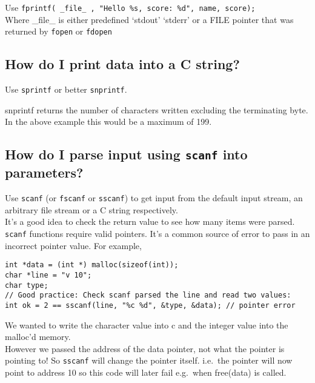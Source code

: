Use
\texttt{fprintf(\ \_file\_\ ,\ "Hello\ \%s,\ score:\ \%d",\ name,\ score);}\\Where
\_file\_ is either predefined `stdout' `stderr' or a FILE pointer that
was returned by \texttt{fopen} or \texttt{fdopen}

\subsection{How do I print data into a C
string?}\label{how-do-i-print-data-into-a-c-string}

Use \texttt{sprintf} or better \texttt{snprintf}.

\begin{Shaded}
\end{Shaded}

snprintf returns the number of characters written excluding the
terminating byte. In the above example this would be a maximum of 199.

\subsection{\texorpdfstring{How do I parse input using \texttt{scanf}
into
parameters?}{How do I parse input using scanf into parameters?}}\label{how-do-i-parse-input-using-scanf-into-parameters}

Use \texttt{scanf} (or \texttt{fscanf} or \texttt{sscanf}) to get input
from the default input stream, an arbitrary file stream or a C string
respectively.\\It's a good idea to check the return value to see how
many items were parsed.\\\texttt{scanf} functions require valid
pointers. It's a common source of error to pass in an incorrect pointer
value. For example,

\begin{verbatim}
int *data = (int *) malloc(sizeof(int));
char *line = "v 10";
char type;
// Good practice: Check scanf parsed the line and read two values:
int ok = 2 == sscanf(line, "%c %d", &type, &data); // pointer error
\end{verbatim}

We wanted to write the character value into c and the integer value into
the malloc'd memory.\\However we passed the address of the data pointer,
not what the pointer is pointing to! So \texttt{sscanf} will change the
pointer itself. i.e.~the pointer will now point to address 10 so this
code will later fail e.g.~when free(data) is called.

